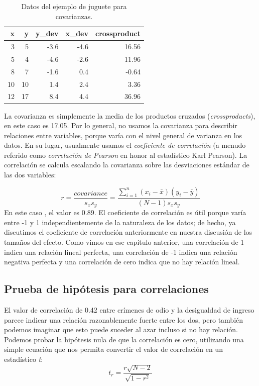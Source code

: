 \documentclass[
  12pt,
]{book}
\begin{document}
\begin{table}

\caption{\label{tab:covTable}Datos del ejemplo de juguete para covarianzas.}
\centering
\begin{tabular}[t]{r|r|r|r|r}
\hline
x & y & y\_dev & x\_dev & crossproduct\\
\hline
3 & 5 & -3.6 & -4.6 & 16.56\\
\hline
5 & 4 & -4.6 & -2.6 & 11.96\\
\hline
8 & 7 & -1.6 & 0.4 & -0.64\\
\hline
10 & 10 & 1.4 & 2.4 & 3.36\\
\hline
12 & 17 & 8.4 & 4.4 & 36.96\\
\hline
\end{tabular}
\end{table}

La covarianza es simplemente la media de los productos cruzados (\emph{crossproducts}), en este caso es 17.05. Por lo general, no usamos la covarianza para describir relaciones entre variables, porque varía con el nivel general de varianza en los datos. En su lugar, usualmente usamos el \emph{coeficiente de correlación} (a menudo referido como \emph{correlación de Pearson} en honor al estadístico Karl Pearson). La correlación se calcula escalando la covarianza sobre las desviaciones estándar de las dos variables:

\[
r = \frac{covariance}{s_xs_y} = \frac{\sum_{i=1}^n (x_i - \bar{x})(y_i - \bar{y})}{(N - 1)s_x s_y}
\]
En este caso , el valor es 0.89. El coeficiente de correlación es útil porque varía entre -1 y 1 independientemente de la naturaleza de los datos; de hecho, ya discutimos el coeficiente de correlación anteriormente en nuestra discusión de los tamaños del efecto. Como vimos en ese capítulo anterior, una correlación de 1 indica una relación lineal perfecta, una correlación de -1 indica una relación negativa perfecta y una correlación de cero indica que no hay relación lineal.

\hypertarget{prueba-de-hipuxf3tesis-para-correlaciones}{%
\subsection{Prueba de hipótesis para correlaciones}\label{prueba-de-hipuxf3tesis-para-correlaciones}}

El valor de correlación de 0.42 entre crímenes de odio y la desigualdad de ingreso parece indicar una relación razonablemente fuerte entre los dos, pero también podemos imaginar que esto puede suceder al azar incluso si no hay relación. Podemos probar la hipótesis nula de que la correlación es cero, utilizando una simple ecuación que nos permita convertir el valor de correlación en un estadístico \emph{t}:
\[
\textit{t}_r =  \frac{r\sqrt{N-2}}{\sqrt{1-r^2}}
\]
\end{document}
